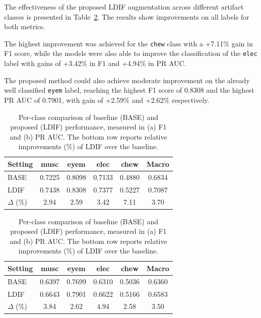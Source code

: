 The effectiveness of the proposed LDIF augmentation across different artifact classes is presented in Table~\ref{tab:combined_performance}. The results show improvements on all labels for both metrics. 

The highest improvement was achieved for the \texttt{chew} class with a +7.11\% gain in F1 score, while the models were also able to improve the classification of the \texttt{elec} label with gains of +3.42\% in F1 and +4.94\% in PR AUC. 

The proposed method could also achieve moderate improvement on the already well classified \texttt{eyem} label, reaching the highest F1 score of 0.8308 and the highest PR AUC of 0.7901, with gain of +2.59\% and +2.62\% respectively.

\begin{table}[H]
\centering

\begin{subtable}[t]{\textwidth}
\centering
\caption{F1 scores}
\renewcommand{\arraystretch}{1.2}
\setlength{\tabcolsep}{5pt}
\begin{tabular}{lccccc}
\hline
Setting & musc & eyem & elec & chew & Macro \\
\hline
BASE             & 0.7225 & 0.8098 & 0.7133 & 0.4880 & 0.6834 \\
LDIF         & 0.7438 & 0.8308 & 0.7377 & 0.5227 & 0.7087 \\
$\Delta$ (\%) & 2.94    & 2.59    & 3.42    & 7.11    & 3.70    \\
\hline
\end{tabular}
\end{subtable}

\vspace{0.4em}

\begin{subtable}[t]{\textwidth}
\centering
\caption{PR AUC scores}
\renewcommand{\arraystretch}{1.2}
\setlength{\tabcolsep}{5pt}
\begin{tabular}{lccccc}
\hline
Setting & musc & eyem & elec & chew & Macro \\
\hline
BASE             & 0.6397 & 0.7699 & 0.6310 & 0.5036 & 0.6360 \\
LDIF         & 0.6643 & 0.7901 & 0.6622 & 0.5166 & 0.6583 \\
$\Delta$ (\%) & 3.84    & 2.62    & 4.94    & 2.58    & 3.50    \\
\hline
\end{tabular}
\end{subtable}

\caption{Per-class comparison of baseline (BASE) and proposed (LDIF) performance, measured in (a) F1 and (b) PR AUC. The bottom row reports relative improvements (\%) of LDIF over the baseline.}
\label{tab:combined_performance}
\end{table}

